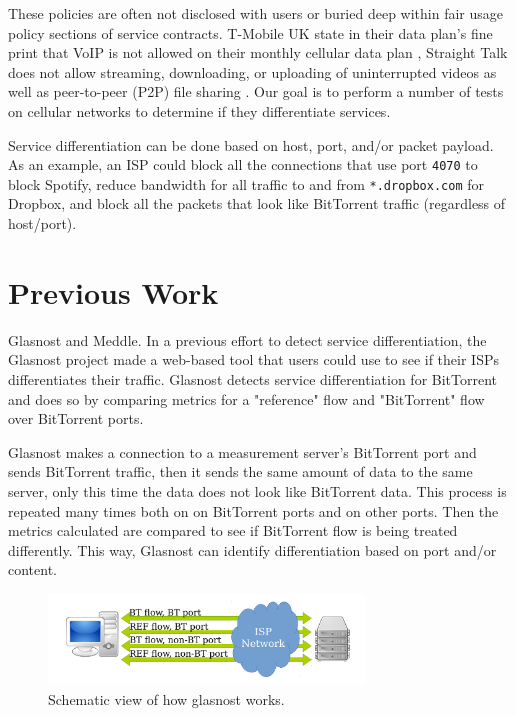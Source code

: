 \documentclass[letterpaper]{sig-alternate-10pt}
\begin{document}
These policies are often not disclosed with users or buried deep within fair usage policy sections of service contracts. T-Mobile UK state in their data plan's fine print that VoIP is not allowed on their monthly cellular data plan \cite{tmobuk}, Straight Talk does not allow streaming, downloading, or uploading of uninterrupted videos as well as peer-to-peer (P2P) file sharing \cite{straighttalk}. Our goal is to perform a number of tests on cellular networks to determine if they differentiate services.

Service differentiation can be done based on host, port, and/or packet payload. As an example, an ISP could block all the connections that use port \texttt{4070} to block Spotify, reduce bandwidth for all traffic to and from \texttt{*.dropbox.com} for Dropbox, and block all the packets that look like BitTorrent traffic (regardless of host/port).

%
\section{Previous Work}
\label{sec:prevwork}

Glasnost and Meddle.
In a previous effort to detect service differentiation, the Glasnost project made a web-based tool that users could use to see if their ISPs differentiates their traffic. Glasnost detects service differentiation for BitTorrent and does so by comparing metrics for a "reference" flow and "BitTorrent" flow over BitTorrent ports.

Glasnost makes a connection to a measurement server's BitTorrent port and sends BitTorrent traffic, then it sends the same amount of data to the same server, only this time the data does not look like BitTorrent data. This process is repeated many times both on on BitTorrent ports and on other ports. Then the metrics calculated are compared to see if BitTorrent flow is being treated differently. This way, Glasnost can identify differentiation based on port and/or content.

\begin{figure}[ht]
\centering
\includegraphics[width=3.3in]{figures/glasnost}
\caption{Schematic view of how glasnost works.}
\label{fig:glasnost}
\end{figure}
\end{document}
